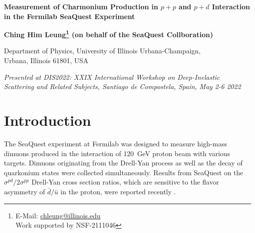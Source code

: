 \documentclass[10pt,a4paper,final]{article}
\begin{document}
\begin{center}
	{\LARGE \bf Measurement of Charmonium Production in $p + p$ and $p + d$ Interaction in the Fermilab SeaQuest Experiment}

	\par\vspace*{2.5mm}\par

	{

		\bigskip

		\large \bf Ching Him Leung\footnote{E-Mail: \href{mailto:chleung@illinois.edu}{chleung@illinois.edu}\\Work supported by NSF-2111046} (on behalf of the SeaQuest Collboration)}

	\vspace*{2.5mm}

	{Department of Physics, University of Illinois Urbana-Champaign, \\Urbana, Illinois 61801, USA}

	\vspace*{2.5mm}

	{\it Presented at DIS2022: XXIX International Workshop on Deep-Inelastic Scattering and Related Subjects, Santiago de Compostela, Spain, May 2-6 2022}


	\vspace*{2.5mm}


\end{center}
\begin{abstract}
	The Fermilab SeaQuest experiment has measured dimuon events from the interaction
	of \SI{120}{\GeV} proton beam on liquid hydrogen and deuterium targets with dimuon
	mass between \num{2} and \SI{9}{\GeV}. These dimuon events contain both the Drell-Yan
	process and the charmonium ($J/\psi$ and $\psi^\prime$) production. Unlike the Drell-Yan process
	which probes the antiquark distributions in the nucleons, the charmonium production
	is sensitive to both quark and gluon distributions. SeaQuest has extracted the
	$\sigma^{pd}/2\sigma^{pp}$ ratios as well as the differential cross sections for
	charmonium production in the kinematic region of $0.4 < x_F < 0.9$. The $\sigma^{pd}/2\sigma^{pp}$
	ratios for charmonium production are found to be significantly different
	from that of the Drell-Yan process. The measured differential cross sections for
	charmonium production are compared with theoretical calculations.
\end{abstract}


\section{Introduction}
\label{sec:intro}
The SeaQuest experiment at Fermilab was designed to measure high-mass dimuons
produced in the interaction of \SI{120}{\GeV} proton beam with various targets.
Dimuons originating from the Drell-Yan process \cite{drell1970} as well as the
decay of quarkonium states were collected simultaneously. Results from SeaQuest
on the $\sigma^{pd}/2\sigma^{pp}$ Drell-Yan cross section ratios, which are sensitive to
the flavor asymmetry of $\bar{d}/\bar{u}$ in the proton, were reported recently
\cite{dove2021}.
\end{document}
